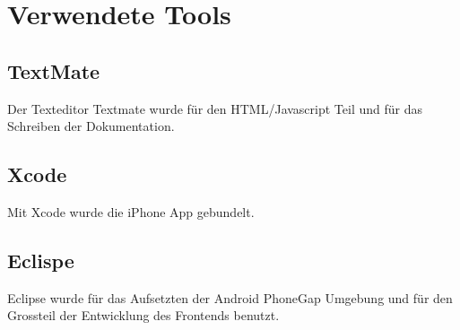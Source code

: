 
\newpage
\section{Verwendete Tools} %
\label{sec:Verwendete Tools}

\subsection{TextMate} %
\label{sub:TextMate}
Der Texteditor Textmate wurde für den HTML/Javascript Teil und für das Schreiben der Dokumentation.

\subsection{Xcode} %
\label{ssub:Xcode}
Mit Xcode wurde die iPhone App gebundelt.

\subsection{Eclispe} %
\label{sub:eclispe}
Eclipse wurde für das Aufsetzten der Android PhoneGap Umgebung und für den Grossteil der Entwicklung des Frontends benutzt.
